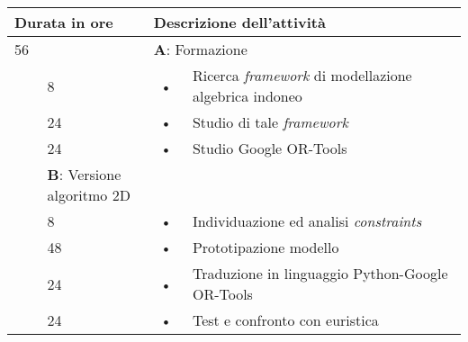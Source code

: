 \begin{center}
	\begin{tabular}{|l|l|c l|}
		\hline
		\multicolumn{2}{|l|}{\textbf{Durata in ore}}		&	\multicolumn{2}{l|}{\textbf{Descrizione dell'attività}}\\
		\hline
		\multicolumn{2}{|l|}{56}	&	\multicolumn{2}{l|}{\textbf{A}: Formazione}\\
		\hline
		\multirow{5}{1cm}{ }    &            8            &            \hspace{5mm}•\hspace{2mm}            &       Ricerca \textit{framework} di modellazione algebrica indoneo\\
		\multirow{5}{1cm}{ }    &            24            &            \hspace{5mm}•\hspace{2mm}            &       Studio di tale \textit{framework}\\
		\multirow{5}{1cm}{ }    &            24            &            \hspace{5mm}•\hspace{2mm}            &       Studio Google OR-Tools\\
		\hline

		\multicolumn{2}{|l|}{104}	&	\multicolumn{2}{l|}{\textbf{B}: Versione algoritmo 2D}\\
		\hline
		\multirow{5}{1cm}{ }    &            8            &            \hspace{5mm}•\hspace{2mm}             &      Individuazione ed analisi \textit{constraints} \\
		\multirow{3}{1cm}{ }    &            48            &            \hspace{5mm}•\hspace{2mm}            &      Prototipazione modello\\
		\multirow{5}{1cm}{ }    &            24            &            \hspace{5mm}•\hspace{2mm}            &      Traduzione in linguaggio Python-Google OR-Tools\\
		\multirow{5}{1cm}{ }    &            24            &            \hspace{5mm}•\hspace{2mm}            &      Test e confronto con euristica\\	
		\hline


\end{tabular}
\end{center}
